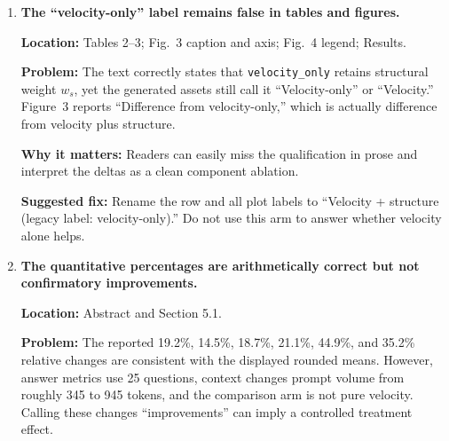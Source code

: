 \documentclass[11pt]{article}
\newcommand{\location}[1]{\textbf{Location:} #1}
\newcommand{\problem}{\textbf{Problem:} }
\newcommand{\impact}{\textbf{Why it matters:} }
\newcommand{\fix}{\textbf{Suggested fix:} }
\begin{document}
\begin{enumerate}
  \location{Abstract; Section 3.4 line 253; Results line 271; Tables 2--3 and Fig.~4.}

  \problem The text states that seeds do not change generation and that the three rows are identical deterministic pseudo-replicates. Nevertheless, the tables report nonzero F1 standard deviations for several systems: for example HotpotQA similarity-threshold $0.324\pm0.012$ and QASPER velocity plus acceleration $0.082\pm0.004$. Figure~4 reproduces these nonzero error bars. The uploaded audit separately claims that seed results are identical to four decimal places.

  \impact Both statements cannot be true. The discrepancy undermines the provenance of the aggregate tables and the paper's statistical correction.

  \fix Recover the three raw result files and publish every seed-level value. Identify any nondeterministic operation or differing query subset. If all predictions are identical, regenerate the tables with zero F1 variation or report a single point estimate. Keep runtime repetitions separate from prediction variability.

  \item \textbf{The ``velocity-only'' label remains false in tables and figures.}

  \location{Tables 2--3; Fig.~3 caption and axis; Fig.~4 legend; Results.}

  \problem The text correctly states that \texttt{velocity\_only} retains structural weight $w_s$, yet the generated assets still call it ``Velocity-only'' or ``Velocity.'' Figure~3 reports ``Difference from velocity-only,'' which is actually difference from velocity plus structure.

  \impact Readers can easily miss the qualification in prose and interpret the deltas as a clean component ablation.

  \fix Rename the row and all plot labels to ``Velocity + structure (legacy label: velocity-only).'' Do not use this arm to answer whether velocity alone helps.

  \item \textbf{The quantitative percentages are arithmetically correct but not confirmatory improvements.}

  \location{Abstract and Section 5.1.}

  \problem The reported 19.2\%, 14.5\%, 18.7\%, 21.1\%, 44.9\%, and 35.2\% relative changes are consistent with the displayed rounded means. However, answer metrics use 25 questions, context changes prompt volume from roughly 345 to 945 tokens, and the comparison arm is not pure velocity. Calling these changes ``improvements'' can imply a controlled treatment effect.


\end{enumerate}
\end{document}
